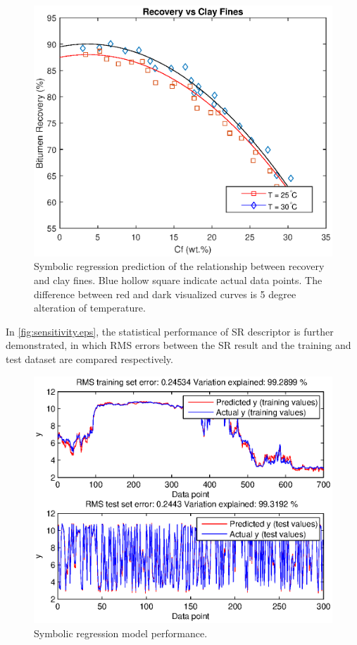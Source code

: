 \documentclass[final,5p,times,twocolumn]{elsarticle}
\begin{document}
\begin{figure}[!hptb]
	\centering
	\includegraphics[width=\linewidth,clip]{Cf_comparison.eps}
	\vspace{-2em}
	\caption{Symbolic regression prediction of the relationship between recovery and clay fines. Blue hollow square indicate actual data points. The difference between red and dark visualized curves is 5 degree alteration of temperature. }
	\label{Cf_comparison}
\end{figure}


In \autoref{fig:sensitivity.eps}, the statistical performance of SR descriptor is further demonstrated, in which RMS errors between the SR result and the training and test dataset are compared respectively.

\begin{figure}[!hptb]
	\centering
	\includegraphics[width=\linewidth,clip]{sensitivity.eps}
	\vspace{-2em}
	\caption{Symbolic regression model performance.}
	\label{fig:sensitivity.eps}
\end{figure}
\end{document}
